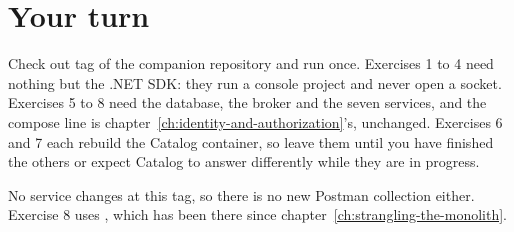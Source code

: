 \section*{Your turn}

Check out tag  of the companion repository and run 
once. Exercises 1 to 4 need nothing but the .NET SDK: they run a console
project and never open a socket. Exercises 5 to 8 need the database, the broker
and the seven services, and the compose line is
chapter~\ref{ch:identity-and-authorization}'s, unchanged. Exercises 6 and 7 each
rebuild the Catalog container, so leave them until you have finished the others
or expect Catalog to answer differently while they are in progress.

No service changes at this tag, so there is no new Postman collection either.
Exercise 8 uses , which has been there since
chapter~\ref{ch:strangling-the-monolith}.


